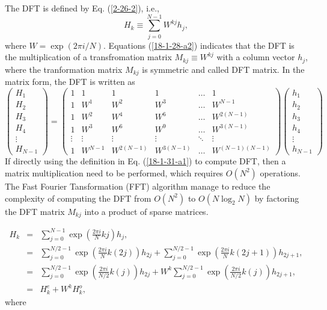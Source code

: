 \documentclass{article}
\begin{document}
The DFT is defined by Eq. (\ref{2-26-2}), i.e.,
\begin{equation}
  \label{18-1-28-a2} H_k \equiv \sum_{j = 0}^{N - 1} W^{k j} h_j,
\end{equation}
where $W = \exp (2 \pi i / N)$. Equations (\ref{18-1-28-a2}) indicates that
the DFT is the multiplication of a transfromation matrix $M_{k j} \equiv W^{k
j}$ with a column vector $h_j$, where the tranformation matrix $M_{k j}$ is
symmetric and called DFT matrix. In the matrix form, the DFT is written as
\begin{equation}
  \label{18-1-31-a1} \left(\begin{array}{c}
    H_1\\
    H_2\\
    H_3\\
    H_4\\
    \vdots\\
    H_{N - 1}
  \end{array}\right) = \left(\begin{array}{cccccc}
    1 & 1 & 1 & 1 & \ldots & 1\\
    1 & W^1 & W^2 & W^3 & \ldots & W^{N - 1}\\
    1 & W^2 & W^4 & W^6 & \ldots & W^{2 (N - 1)}\\
    1 & W^3 & W^6 & W^9 & \ldots & W^{3 (N - 1)}\\
    \vdots & \vdots & \vdots & \vdots & \ddots & \vdots\\
    1 & W^{N - 1} & W^{2 (N - 1)} & W^{3 (N - 1)} & \ldots & W^{(N - 1) (N -
    1)}
  \end{array}\right) \left(\begin{array}{c}
    h_1\\
    h_2\\
    h_3\\
    h_4\\
    \vdots\\
    h_{N - 1}
  \end{array}\right)
\end{equation}
If directly using the definition in Eq. (\ref{18-1-31-a1}) to compute DFT,
then a matrix multiplication need to be performed, which requires $O (N^2)$
operations. The Fast Fourier Tansformation (FFT) algorithm manage to reduce
the complexity of computing the DFT from $O (N^2)$ to $O (N \log_2 N)$ by
factoring the DFT matrix $M_{k j}$ into a product of sparse matrices.


\begin{eqnarray}
  H_k & = & \sum_{j = 0}^{N - 1} \exp \left( \frac{2 \pi i}{N} k j \right)
  h_j, \nonumber\\
  & = & \sum_{j = 0}^{N / 2 - 1} \exp \left( \frac{2 \pi i}{N} k (2 j)
  \right) h_{2 j} + \sum_{j = 0}^{N / 2 - 1} \exp \left( \frac{2 \pi i}{N} k
  (2 j + 1) \right) h_{2 j + 1}, \nonumber\\
  & = & \sum_{j = 0}^{N / 2 - 1} \exp \left( \frac{2 \pi i}{N / 2} k (j)
  \right) h_{2 j} + W^k \sum_{j = 0}^{N / 2 - 1} \exp \left( \frac{2 \pi i}{N
  / 2} k (j) \right) h_{2 j + 1}, \nonumber\\
  & = & H_k^e + W^k H_k^o, 
\end{eqnarray}
where
\end{document}
